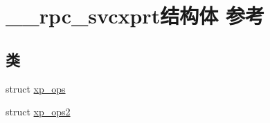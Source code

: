 \hypertarget{struct____rpc__svcxprt}{}\section{\+\_\+\+\_\+rpc\+\_\+svcxprt结构体 参考}
\label{struct____rpc__svcxprt}
\subsection*{类}
\begin{DoxyCompactItemize}
\item 
struct \hyperlink{struct____rpc__svcxprt_1_1xp__ops}{xp\+\_\+ops}
\item 
struct \hyperlink{struct____rpc__svcxprt_1_1xp__ops2}{xp\+\_\+ops2}
\end{DoxyCompactItemize}
